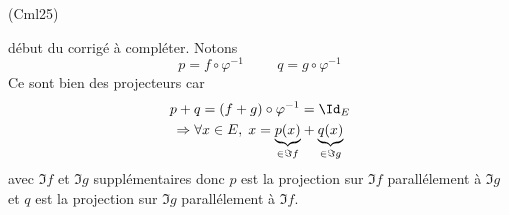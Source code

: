\begin{tiny}(Cml25)\end{tiny} début du corrigé à compléter. Notons
\begin{displaymath}
  p = f\circ \varphi^{-1} \hspace{1cm} q = g\circ \varphi^{-1}
\end{displaymath}
Ce sont bien des projecteurs car
\begin{multline*}
  p + q = (f+g)\circ \varphi^{-1} = \Id_E\\
\Rightarrow \forall x\in E,\;
x = \underset{\in \Im f}{\underbrace{p(x)}} + \underset{\in \Im g}{\underbrace{q(x)}}
\end{multline*}
avec $\Im f$ et $\Im g$ supplémentaires donc $p$ est la projection sur $\Im f$ parallélement à $\Im g$ et $q$ est la projection sur $\Im g$ parallélement à $\Im f$.